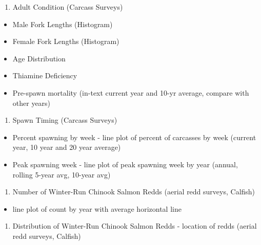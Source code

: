 \documentclass[
]{book}
\providecommand{\tightlist}{%
  \setlength{\itemsep}{0pt}\setlength{\parskip}{0pt}}
\theoremstyle{definition}
\theoremstyle{definition}
\theoremstyle{definition}
\theoremstyle{definition}
\theoremstyle{remark}
\begin{document}
\begin{enumerate}
\def\labelenumi{\arabic{enumi}.}
\setcounter{enumi}{3}
\tightlist
\item
  Adult Condition (Carcass Surveys)
\end{enumerate}

\begin{itemize}
\tightlist
\item
  Male Fork Lengths (Histogram)
\item
  Female Fork Lengths (Histogram)
\item
  Age Distribution
\item
  Thiamine Deficiency
\item
  Pre-spawn mortality (in-text current year and 10-yr average, compare with other years)
\end{itemize}

\begin{enumerate}
\def\labelenumi{\arabic{enumi}.}
\setcounter{enumi}{4}
\tightlist
\item
  Spawn Timing (Carcass Surveys)
\end{enumerate}

\begin{itemize}
\tightlist
\item
  Percent spawning by week - line plot of percent of carcasses by week (current year, 10 year and 20 year average)
\item
  Peak spawning week - line plot of peak spawning week by year (annual, rolling 5-year avg, 10-year avg)
\end{itemize}

\begin{enumerate}
\def\labelenumi{\arabic{enumi}.}
\setcounter{enumi}{5}
\tightlist
\item
  Number of Winter-Run Chinook Salmon Redds (aerial redd surveys, Calfish)
\end{enumerate}

\begin{itemize}
\tightlist
\item
  line plot of count by year with average horizontal line
\end{itemize}

\begin{enumerate}
\def\labelenumi{\arabic{enumi}.}
\setcounter{enumi}{6}
\tightlist
\item
  Distribution of Winter-Run Chinook Salmon Redds - location of redds (aerial redd surveys, Calfish)
\end{enumerate}
\end{document}
